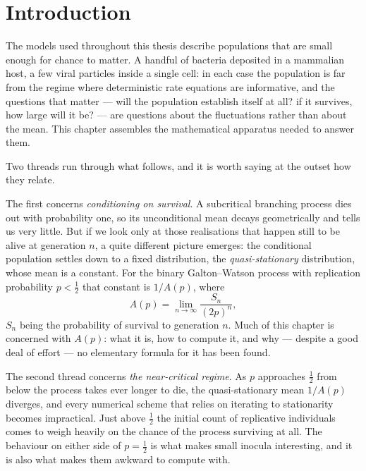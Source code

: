 \section{Introduction}
\label{sec:intro}

The models used throughout this thesis describe populations that are small enough
for chance to matter. A handful of bacteria deposited in a mammalian host, a few
viral particles inside a single cell: in each case the population is far from the
regime where deterministic rate equations are informative, and the questions that
matter --- will the population establish itself at all? if it survives, how large
will it be? --- are questions about the fluctuations rather than about the mean.
This chapter assembles the mathematical apparatus needed to answer them.

Two threads run through what follows, and it is worth saying at the outset how they
relate.

The first concerns \emph{conditioning on survival}. A subcritical branching process
dies out with probability one, so its unconditional mean decays geometrically and
tells us very little. But if we look only at those realisations that happen still to
be alive at generation $n$, a quite different picture emerges: the conditional
population settles down to a fixed distribution, the \emph{quasi-stationary}
distribution, whose mean is a constant. For the binary Galton--Watson process with
replication probability $p<\tfrac12$ that constant is $1/A(p)$, where
\begin{equation*}
A(p) = \lim_{n\to\infty}\frac{S_n}{(2p)^n},
\end{equation*}
$S_n$ being the probability of survival to generation $n$. Much of this chapter is
concerned with $A(p)$: what it is, how to compute it, and why --- despite a good deal
of effort --- no elementary formula for it has been found.

The second thread concerns \emph{the near-critical regime}. As $p$ approaches
$\tfrac12$ from below the process takes ever longer to die, the quasi-stationary mean
$1/A(p)$ diverges, and every numerical scheme that relies on iterating to
stationarity becomes impractical. Just above $\tfrac12$ the initial count of
replicative individuals comes to weigh heavily on the chance of the process
surviving at all. The behaviour on either side of $p=\tfrac12$ is what makes small
inocula interesting, and it is also what makes them awkward to compute with.

